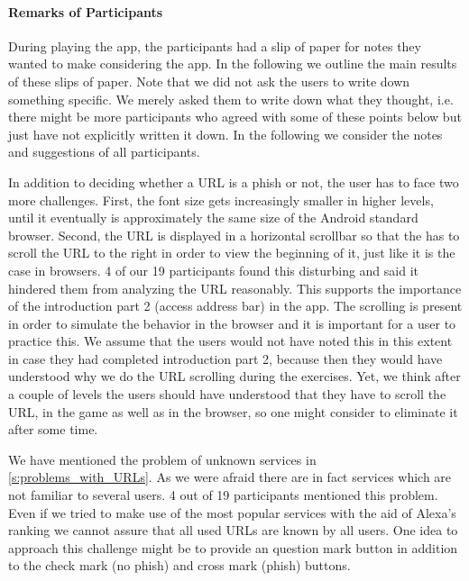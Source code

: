 \paragraph{Remarks of Participants}
During playing the app, the participants had a slip of paper for notes they wanted to make considering the app.
In the following we outline the main results of these slips of paper.
Note that we did not ask the users to write down something specific. 
We merely asked them to write down what they thought, i.e. there might be more participants who agreed with some of these points below but just have not explicitly written it down.
In the following we consider the notes and suggestions of all participants. 
\begin{description}[leftmargin=0cm]	
	\item[Scrolling of URL:] In addition to deciding whether a URL is a phish or not, the user has to face two more challenges. 
First, the font size gets increasingly smaller in higher levels, until it eventually is approximately the same size of the Android standard browser.
Second, the URL is displayed in a horizontal scrollbar so that the has to scroll the URL to the right in order to view the beginning of it, just like it is the case in browsers.
4 of our 19 participants found this disturbing and said it hindered them from analyzing the URL reasonably. 
This supports the importance of the introduction part 2 (access address bar) in the app.
The scrolling is present in order to simulate the behavior in the browser and it is important for a user to practice this.
We assume that the users would not have noted this in this extent in case they had completed introduction part 2, because then they would have understood why we do the URL scrolling during the exercises.
Yet, we think after a couple of levels the users should have understood that they have to scroll the URL, in the game as well as in the browser, so one might consider to eliminate it after some time. 
	\item[Unknown Services:] We have mentioned the problem of unknown services in \autoref{s:problems_with_URLs}.
As we were afraid there are in fact services which are not familiar to several users.
4 out of 19 participants mentioned this problem.
Even if we tried to make use of the most popular services with the aid of Alexa's~\cite{alexa} ranking we cannot assure that all used URLs are known by all users.
One idea to approach this challenge might be to provide an question mark button in addition to the check mark (no phish) and cross mark (phish) buttons. 

\end{description}
